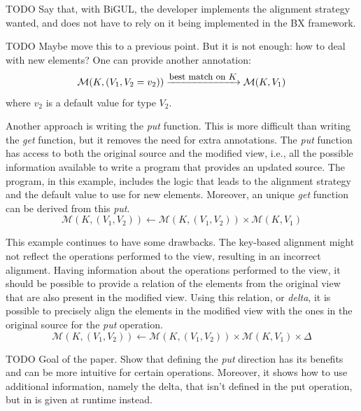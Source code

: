 \documentclass[preprint,numbers]{sigplanconf}
\newcommand{\TODO}[1]{{\color{black!10!blue}TODO #1}}
\begin{document}
\TODO{Say that, with BiGUL, the developer implements the alignment strategy
wanted, and does not have to rely on it being implemented in the BX framework.}

\TODO{Maybe move this to a previous point.}
But it is not enough: how to deal with new elements? One can provide
another annotation:
%
\[ \mathcal M (K, (V_1, V_2 = v_2)) \xrightarrow{\text{\small best match on \(K\)}} \mathcal M (K, V_1) \]
%
where \(v_2\) is a default value for type \(V_2\).

%
%

Another approach is writing the \emph{put} function. This is more difficult than
writing the \emph{get} function, but it removes the need for extra annotations.
The \emph{put} function has access to both the original source and the modified
view, i.e., all the possible information available to write a program that
provides an updated source. The program, in this example, includes the logic
that leads to the alignment strategy and the default value to use for new
elements. Moreover, an unique \emph{get} function can be derived from this
\emph{put}.
%
\[ \mathcal M (K, (V_1, V_2)) \longleftarrow \mathcal M (K, (V_1, V_2)) \times \mathcal M (K, V_1) \]

%
%

This example continues to have some drawbacks. The key-based alignment might not
reflect the operations performed to the view, resulting in an incorrect
alignment. Having information about the operations performed to the view, it
should be possible to provide a relation of the elements from the original view
that are also present in the modified view. Using this relation, or
\emph{delta}, it is possible to precisely align the elements in the modified
view with the ones in the original source for the \emph{put} operation.
%
\[ \mathcal M (K, (V_1, V_2)) \longleftarrow \mathcal M (K, (V_1, V_2)) \times \mathcal M (K, V_1) \times \Delta \]

\TODO{Goal of the paper. Show that defining the \emph{put} direction has its
benefits and can be more intuitive for certain operations. Moreover, it shows
how to use additional information, namely the delta, that isn't defined in the
put operation, but in is given at runtime instead.}

\end{document}
